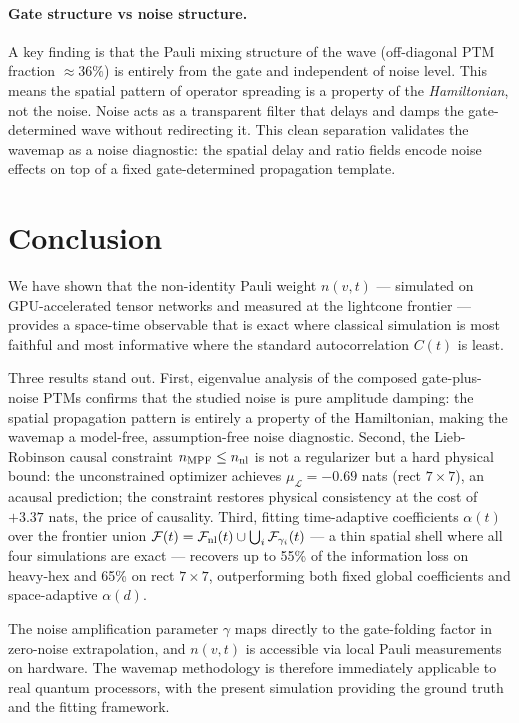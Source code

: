 \documentclass[12pt]{article}
\begin{document}
\paragraph{Gate structure vs noise structure.}
A key finding is that the Pauli mixing structure of the wave (off-diagonal
PTM fraction $\approx 36\%$) is entirely from the gate and independent of
noise level.
This means the spatial pattern of operator spreading is a property of the
\emph{Hamiltonian}, not the noise.
Noise acts as a transparent filter that delays and damps the gate-determined
wave without redirecting it.
This clean separation validates the wavemap as a noise diagnostic:
the spatial delay and ratio fields encode noise effects on top of a
fixed gate-determined propagation template.

\section*{Conclusion}

We have shown that the non-identity Pauli weight $n(v,t)$ — simulated on
GPU-accelerated tensor networks and measured at the lightcone frontier —
provides a space-time observable that is exact where classical simulation
is most faithful and most informative where the standard autocorrelation
$C(t)$ is least.

Three results stand out.
First, eigenvalue analysis of the composed gate-plus-noise PTMs confirms
that the studied noise is pure amplitude damping: the spatial propagation
pattern is entirely a property of the Hamiltonian, making the wavemap a
model-free, assumption-free noise diagnostic.
Second, the Lieb-Robinson causal constraint $n_{\rm MPF} \leq n_{\rm nl}$
is not a regularizer but a hard physical bound: the unconstrained optimizer
achieves $\mu_\mathcal{L} = -0.69$ nats (rect $7\times7$), an acausal
prediction; the constraint restores physical consistency at the cost of
$+3.37$ nats, the price of causality.
Third, fitting time-adaptive coefficients $\alpha(t)$ over the frontier
union $\mathcal{F}(t) = \mathcal{F}_{\rm nl}(t) \cup \bigcup_i
\mathcal{F}_{\gamma_i}(t)$ — a thin spatial shell where all four
simulations are exact — recovers up to 55\% of the information loss
on heavy-hex and 65\% on rect $7\times7$, outperforming both fixed
global coefficients and space-adaptive $\alpha(d)$.

The noise amplification parameter $\gamma$ maps directly to the
gate-folding factor in zero-noise extrapolation, and $n(v,t)$ is
accessible via local Pauli measurements on hardware.
The wavemap methodology is therefore immediately applicable to real
quantum processors, with the present simulation providing the ground
truth and the fitting framework.




\end{document}
